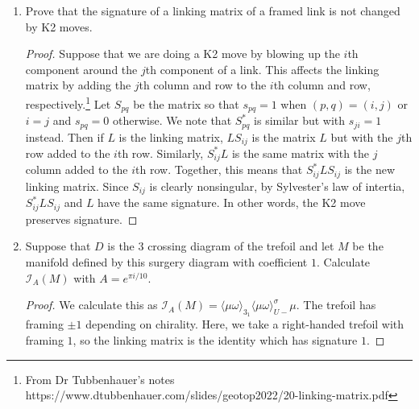\documentclass{article}
\def\cI{\mathcal{I}}
\begin{document}
\begin{enumerate}
\begin{proof}
      This means that interchanging $x$ and $y$ does not change the number of closed curves of the diagram, and so it does not change the trace. It remains to show that the trace is nondegenerate when $A$ is not a root of unity.\smallskip

      To see this, suppose that for some $x\neq 0$, we have $\operatorname*{tr}(xy) = 0$ for all $y\in TL_n.$
    \end{proof}
    \item Prove that the signature of a linking matrix of a framed link is not changed by K2 moves.
    \begin{proof}
      Suppose that we are doing a K2 move by blowing up the $i$th component around the $j$th component of a link. This affects the linking matrix by adding the $j$th column and row to the $i$th column and row, respectively.\footnote{From Dr Tubbenhauer's notes https://www.dtubbenhauer.com/slides/geotop2022/20-linking-matrix.pdf} Let $S_{pq}$ be the matrix so that $s_{pq} = 1$ when $(p,q) =(i,j)$ or $i=j$ and $s_{pq} = 0$ otherwise. We note that $S^*_{pq}$ is similar but with $s_{ji} =1$ instead. Then if $L$ is the linking matrix, $LS_{ij}$ is the matrix $L$ but with the $j$th row added to the $i$th row. Similarly, $S_{ij}^*L$ is the same matrix with the $j$ column added to the $i$th row. Together, this means that $S_{ij}^*LS_{ij}$ is the new linking matrix. Since $S_{ij}$ is clearly nonsingular, by Sylvester's law of intertia, $S_{ij}^*LS_{ij}$ and $L$ have the same signature. In other words, the K2 move preserves signature. 
    \end{proof}
    \pagebreak
    \item Suppose that $D$ is the 3 crossing diagram of the trefoil and let $M$ be the manifold defined by this surgery diagram with coefficient $1.$ Calculate $\cI_A(M)$ with $A = e^{\pi i/10}.$
      \begin{proof}
      We calculate this as $\cI_A(M) = \langle\mu\omega\rangle_{3_1}\langle\mu\omega\rangle_{U-}^\sigma\mu.$ The trefoil has framing $\pm 1$ depending on chirality. Here, we take a right-handed trefoil with framing $1$, so the linking matrix is the identity which has signature $1.$\smallskip


\end{proof}
\end{enumerate}
\end{document}
